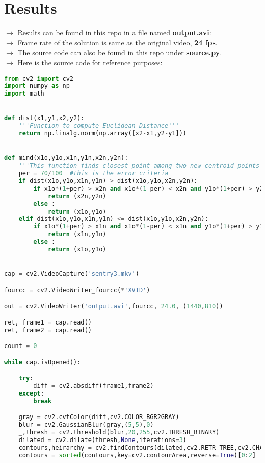 \documentclass{article}
\begin{document}
\section*{Results}
$\rightarrow$ Results can be found in this repo in a file named \textbf{output.avi}:\\
$\rightarrow$ Frame rate of the solution is same as the original video, \textbf{24 fps}.\\
$\rightarrow$ The source code can also be found in this repo under \textbf{source.py}.\\
$\rightarrow$ Here is the source code for reference purposes:
\newpage
\begin{lstlisting}[language=python,caption={Source Code}]
from cv2 import cv2
import numpy as np
import math


def dist(x1,y1,x2,y2):
    '''Function to compute Euclidean Distance'''
    return np.linalg.norm(np.array([x2-x1,y2-y1]))


def mind(x1o,y1o,x1n,y1n,x2n,y2n):
    '''This function finds closest point among two new centroid points of two bots''' 
    per = 70/100  #this is the error criteria
    if dist(x1o,y1o,x1n,y1n) > dist(x1o,y1o,x2n,y2n):
        if x1o*(1+per) > x2n and x1o*(1-per) < x2n and y1o*(1+per) > y2n and y1o*(1-per) < y2n:
            return (x2n,y2n)
        else :
            return (x1o,y1o)
    elif dist(x1o,y1o,x1n,y1n) <= dist(x1o,y1o,x2n,y2n):
        if x1o*(1+per) > x1n and x1o*(1-per) < x1n and y1o*(1+per) > y1n and y1o*(1-per) < y1n:
            return (x1n,y1n)
        else :
            return (x1o,y1o)


cap = cv2.VideoCapture('sentry3.mkv')

fourcc = cv2.VideoWriter_fourcc(*'XVID')

out = cv2.VideoWriter('output.avi',fourcc, 24.0, (1440,810))

ret, frame1 = cap.read()
ret, frame2 = cap.read()

count = 0

while cap.isOpened():

    try:
        diff = cv2.absdiff(frame1,frame2)
    except:
        break

    gray = cv2.cvtColor(diff,cv2.COLOR_BGR2GRAY)
    blur = cv2.GaussianBlur(gray,(5,5),0)
    _,thresh = cv2.threshold(blur,20,255,cv2.THRESH_BINARY)
    dilated = cv2.dilate(thresh,None,iterations=3)
    contours,heirarchy = cv2.findContours(dilated,cv2.RETR_TREE,cv2.CHAIN_APPROX_SIMPLE)
    contours = sorted(contours,key=cv2.contourArea,reverse=True)[0:2]


\end{lstlisting}
\end{document}
